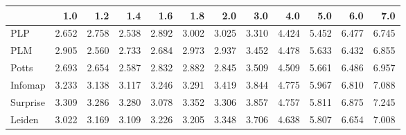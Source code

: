 \begin{tabular}{lrrrrrrrrrrr}
\toprule
{} &   1.0 &   1.2 &   1.4 &   1.6 &   1.8 &   2.0 &   3.0 &   4.0 &   5.0 &   6.0 &   7.0 \\
\midrule
PLP      & 2.652 & 2.758 & 2.538 & 2.892 & 3.002 & 3.025 & 3.310 & 4.424 & 5.452 & 6.477 & 6.745 \\
PLM      & 2.905 & 2.560 & 2.733 & 2.684 & 2.973 & 2.937 & 3.452 & 4.478 & 5.633 & 6.432 & 6.855 \\
Potts    & 2.693 & 2.654 & 2.587 & 2.832 & 2.882 & 2.845 & 3.509 & 4.509 & 5.661 & 6.486 & 6.957 \\
Infomap  & 3.233 & 3.138 & 3.117 & 3.246 & 3.291 & 3.419 & 3.844 & 4.775 & 5.967 & 6.810 & 7.088 \\
Surprise & 3.309 & 3.286 & 3.280 & 3.078 & 3.352 & 3.306 & 3.857 & 4.757 & 5.811 & 6.875 & 7.245 \\
Leiden   & 3.022 & 3.169 & 3.109 & 3.226 & 3.205 & 3.348 & 3.706 & 4.638 & 5.807 & 6.654 & 7.008 \\
\bottomrule
\end{tabular}
